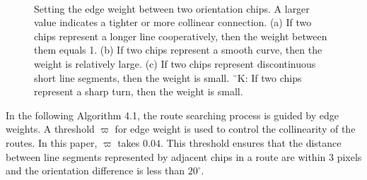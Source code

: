 \documentclass[journal]{IEEEtran}
\begin{document}
\begin{figure}[!t]
\centering
{}
\hfil
{}\\
\hfil
{}
\caption{Setting the edge weight between two orientation chips. 
A larger value indicates a tighter or more collinear connection.
(a) If two chips represent a longer line cooperatively, then the weight between them equals 1.
(b) If two chips represent a smooth curve, then the weight is relatively large.
(c) If two chips represent discontinuous short line segments, then the weight is small.
¨K: If two chips represent a sharp turn, then the weight is small.}
\label{fig:10}
\end{figure}

In the following Algorithm 4.1, the route searching process is guided by edge weights.
A threshold $\varpi$ for edge weight is used to control the collinearity of the routes.
In this paper, $\varpi$ takes $0.04$.
This threshold ensures that the distance between line segments represented by adjacent chips in a route are within 3 pixels and the orientation difference is less than $20^\circ$.
\end{document}
